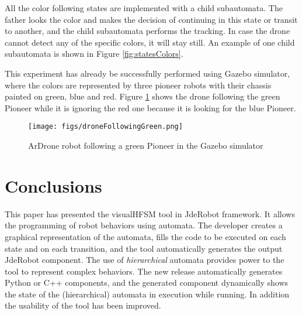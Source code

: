 \documentclass[journal,twoside]{JoPhA}
\begin{document}
All the color following states are implemented with a child subautomata. The father looks the color and makes the decision of continuing in this state or transit to another, and the child subautomata performs the tracking. In case the drone cannot detect any of the specific colors, it will stay still. An example of one child subautomata is shown in Figure \ref{fig:statesColors}.

This experiment has already be successfully performed using Gazebo simulator, where the colors are represented by three pioneer robots with their chassis painted on green, blue and red. Figure \ref{fig:followGreen} shows the drone following the green Pioneer while it is ignoring the red one because it is looking for the blue Pioneer.

\begin{figure}[ht!]
\begin{center}
        \texttt{[image: figs/droneFollowingGreen.png]}
\end{center}
\caption{ArDrone robot following a green Pioneer in the Gazebo simulator}
\label{fig:followGreen}

\end{figure}


\section{Conclusions}

This paper has presented the visualHFSM tool in JdeRobot framework. It allows the programming of robot behaviors using automata. The developer creates a graphical representation of the automata, fills the code to be executed on each state and on each transition, and the tool automatically generates the output JdeRobot component. The use of \textit{hierarchical} automata provides power to the tool to represent complex behaviors. The new release automatically generates Python or C++ components, and the generated component dynamically shows the state of the (hierarchical) automata in execution while running. In addition the usability of the tool has been improved.

\end{document}
